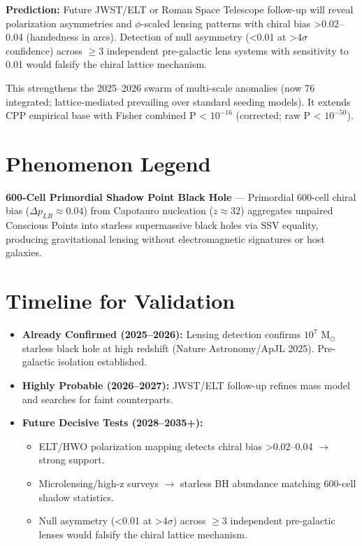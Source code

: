 \documentclass[11pt]{article}
\begin{document}
\textbf{Prediction:} Future JWST/ELT or Roman Space Telescope follow-up will reveal polarization asymmetries and $\phi$-scaled lensing patterns with chiral bias >0.02--0.04 (handedness in arcs). Detection of null asymmetry (<0.01 at >4$\sigma$ confidence) across $\geq 3$ independent pre-galactic lens systems with sensitivity to 0.01 would falsify the chiral lattice mechanism.

This strengthens the 2025--2026 swarm of multi-scale anomalies (now 76 integrated; lattice-mediated prevailing over standard seeding models). It extends CPP empirical base with Fisher combined P < $10^{-16}$ (corrected; raw P < $10^{-50}$).

\section{Phenomenon Legend}
\textbf{600-Cell Primordial Shadow Point Black Hole} — Primordial 600-cell chiral bias ($\Delta p_{LR} \approx 0.04$) from Capotauro nucleation ($z \approx 32$) aggregates unpaired Conscious Points into starless supermassive black holes via SSV equality, producing gravitational lensing without electromagnetic signatures or host galaxies.

\section{Timeline for Validation}
\begin{itemize}
    \item \textbf{Already Confirmed (2025--2026):} Lensing detection confirms $10^7$ M$_\odot$ starless black hole at high redshift (Nature Astronomy/ApJL 2025). Pre-galactic isolation established.
    \item \textbf{Highly Probable (2026--2027):} JWST/ELT follow-up refines mass model and searches for faint counterparts.
    \item \textbf{Future Decisive Tests (2028--2035+):}
    \begin{itemize}
        \item ELT/HWO polarization mapping detects chiral bias >0.02--0.04 $\to$ strong support.
        \item Microlensing/high-z surveys $\to$ starless BH abundance matching 600-cell shadow statistics.
        \item Null asymmetry (<0.01 at >4$\sigma$) across $\geq 3$ independent pre-galactic lenses would falsify the chiral lattice mechanism.
    \end{itemize}
\end{itemize}
\end{document}
